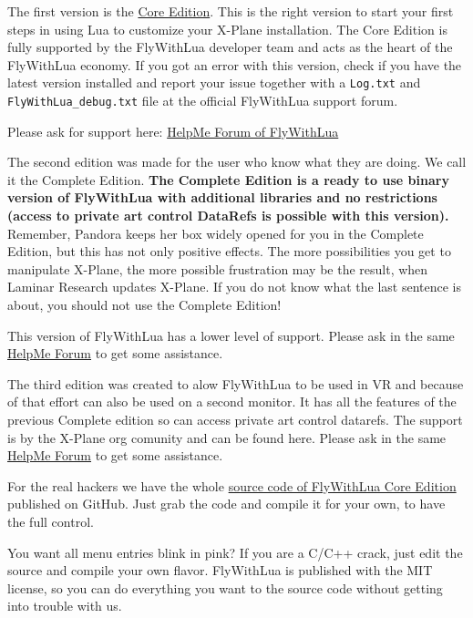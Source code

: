 \documentclass[11pt,parskip=half,a4paper]{scrartcl}
\begin{document}
The first version is the \href{http://forums.x-plane.org/index.php?/files/file/35579-flywithlua-core-edition-for-x-plane-11-windows-linux-mac-os-x-version/}{Core Edition}. This is the right version to start your first steps in using Lua to customize your X-Plane installation. The Core Edition is fully supported by the FlyWithLua developer team and acts as the heart of the FlyWithLua economy. If you got an error with this version, check if you have the latest version installed and report your issue together with a \verb|Log.txt| and \verb|FlyWithLua_debug.txt| file at the official FlyWithLua support forum.

Please ask for support here: \href{http://forums.x-plane.org/index.php?/forums/forum/335-help-me-i-have-a-problem-with-flywithlua/}{HelpMe Forum of FlyWithLua}

The second edition was made for the user who know what they are doing. We call it the Complete Edition. \textbf{The Complete Edition is a ready to use binary version of FlyWithLua with additional libraries and no restrictions (access to private art control DataRefs is possible with this version).} Remember, Pandora keeps her box widely opened for you in the Complete Edition, but this has not only positive effects. The more possibilities you get to manipulate X-Plane, the more possible frustration may be the result, when Laminar Research updates X-Plane. If you do not know what the last sentence is about, you should not use the Complete Edition!

This version of FlyWithLua has a lower level of support. Please ask in the same \href{http://forums.x-plane.org/index.php?/forums/forum/335-help-me-i-have-a-problem-with-flywithlua/}{HelpMe Forum} to get some assistance.

The third edition was created to alow FlyWithLua to be used in VR and because of that effort can also be used on a second monitor. It has all the features of the previous Complete edition so can access private art control datarefs. The support is by the X-Plane org comunity and can be found here. Please ask in the same \href{http://forums.x-plane.org/index.php?/forums/forum/335-help-me-i-have-a-problem-with-flywithlua/}{HelpMe Forum} to get some assistance. 

For the real hackers we have the whole \href{https://github.com/X-Friese/FlyWithLua}{source code of FlyWithLua Core Edition} published on GitHub. Just grab the code and compile it for your own, to have the full control.

You want all menu entries blink in pink? If you are a C/C++ crack, just edit the source and compile your own flavor. FlyWithLua is published with the MIT license, so you can do everything you want to the source code without getting into trouble with us.
\end{document}

